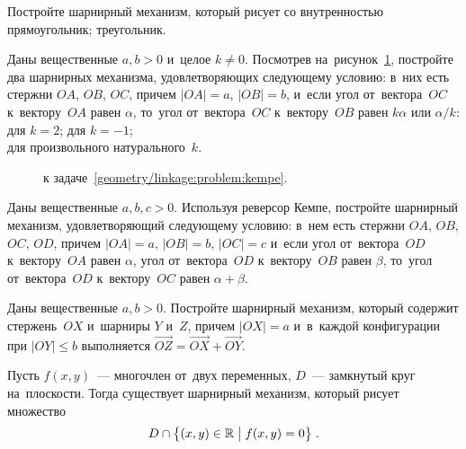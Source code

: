 \begin{problems}

\item
Постройте шарнирный механизм, который рисует со внутренностью
\\
\subproblem прямоугольник;
\quad
\subproblem треугольник.

\item{}
\label{geometry/linkage:problem:kempe}%
Даны вещественные $a, b > 0$ и~целое $k \neq 0$.
Посмотрев на~рисунок~\ref{geometry/linkage:problem:kempe:fig},
постройте два шарнирных механизма, удовлетворяющих
следующему условию: в~них есть стержни $OA$, $OB$, $OC$, причем $|OA| = a$,
$|OB| = b$, и~если угол от~вектора~$OC$ к~вектору~$OA$ равен $\alpha$, то~угол
от~вектора~$OC$ к~вектору~$OB$ равен $k \alpha$ или $\alpha / k$:
\\
\subproblem для $k = 2$;
\quad
\subproblem для $k = -1$;
\\
\subproblem для произвольного натурального~$k$.

\begin{figure}[ht]
\begin{center}
    \caption{к задаче~\ref{geometry/linkage:problem:kempe}.}
    \label{geometry/linkage:problem:kempe:fig}
\end{center}
\end{figure}

\item{}
Даны вещественные $a, b, c > 0$.
Используя реверсор Кемпе, постройте шарнирный механизм, удовлетворяющий
следующему условию: в~нем есть стержни $OA$, $OB$, $OC$, $OD$, причем
$|OA| = a$, $|OB| = b$, $|OC| = c$ и~если угол от~вектора~$OD$ к~вектору~$OA$
равен $\alpha$, угол от~вектора~$OD$ к~вектору~$OB$ равен $\beta$, то~угол
от~вектора~$OD$ к~вектору~$OC$ равен $\alpha + \beta$.

\let\ov\overrightarrow

\item{}
Даны вещественные $a, b > 0$.
Постройте шарнирный механизм, который содержит стержень~$OX$ и~шарниры
$Y$ и~$Z$, причем $|OX| = a$ и~в~каждой конфигурации при $|OY| \leq b$
выполняется $\ov{OZ} = \ov{OX} + \ov{OY}$.

\end{problems}

Пусть $f(x, y)$~--- многочлен от~двух переменных, $D$~--- замкнутый круг
на~плоскости.
Тогда существует шарнирный механизм, который рисует множество
\[
    D \cap
    \bigl\{
        (x,y) \in \mathbb{R}
    \bigm|
        f(x, y) = 0
    \bigr\}
\; . \]

